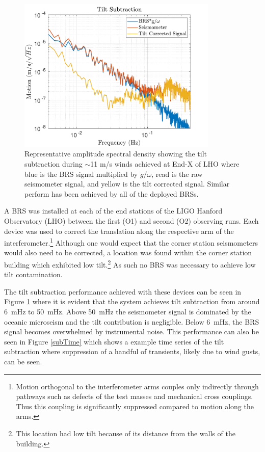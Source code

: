 \documentclass [12pt, proquest]{uwthesis}[2019]
\begin{document}
\begin{figure}[!h]
\begin{center}
\includegraphics[width=0.85\textwidth]{TiltCorrSpec.pdf}
\caption[Representative amplitude spectral density showing the tilt subtraction during windy conditions]{Representative amplitude spectral density showing the tilt subtraction during $\sim$11 m/s winds achieved at End-X of LHO where blue is the BRS signal multiplied by $g/\omega$, read is the raw seismometer signal, and yellow is the tilt corrected signal. Similar perform has been achieved by all of the deployed BRSs.}
\label{sub}
\end{center}
\end{figure}

\quad A BRS was installed at each of the end stations of the LIGO Hanford Observatory (LHO) between the first (O1) and second (O2) observing runs. Each device was used to correct the translation along the respective arm of the interferometer.\footnote{Motion orthogonal to the interferometer arms couples only indirectly through pathways such as defects of the test masses and mechanical cross couplings. Thus this coupling is significantly suppressed compared to motion along the arms.} Although one would expect that the corner station seismometers would also need to be corrected, a location was found within the corner station building which exhibited low tilt.\footnote{This location had low tilt because of its distance from the walls of the building.} As such no BRS was necessary to achieve low tilt contamination.


The tilt subtraction performance achieved with these devices can be seen in Figure \ref{sub} where it is evident that the system achieves tilt subtraction from around 6~mHz to 50~mHz. Above 50~mHz the seismometer signal is dominated by the oceanic microseism and the tilt contribution is negligible. Below 6~mHz, the BRS signal becomes overwhelmed by instrumental noise. This performance can also be seen in Figure \ref{subTime} which shows a example time series of the tilt subtraction where suppression of a handful of transients, likely due to wind gusts, can be seen.
\end{document}
